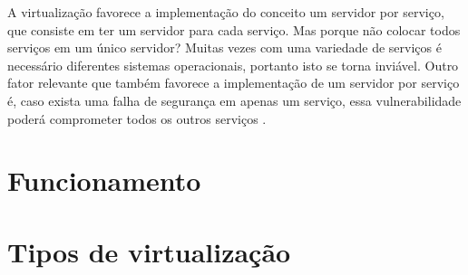 A virtualização favorece a implementação do conceito um servidor por serviço, que consiste em ter um servidor para cada serviço.
Mas porque não colocar todos serviços em um único servidor? Muitas vezes com uma variedade de serviços é necessário diferentes 
sistemas operacionais, portanto isto se torna inviável. Outro fator relevante que também favorece a implementação de um servidor por
serviço é, caso exista uma falha de segurança em apenas um serviço, essa vulnerabilidade poderá comprometer todos os outros serviços 
\cite{carissimi2008}.

\section{Funcionamento}


\section{Tipos de virtualização}




